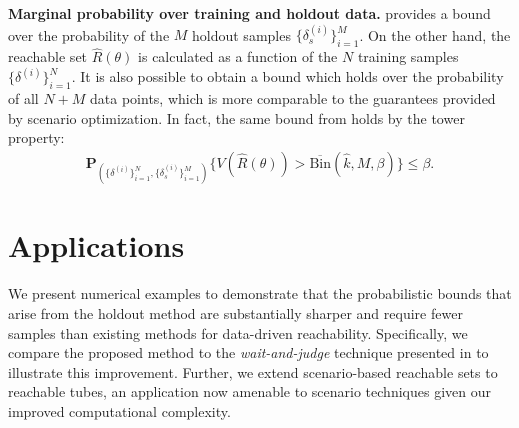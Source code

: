 \documentclass[letterpaper, 10 pt, conference]{ieeeconf}  %
\begin{document}
\textbf{Marginal probability over training and holdout data.}
 provides a bound over the probability of the $M$ holdout samples $\{\delta_s^{(i)}\}_{i=1}^{M}$.
On the other hand, the reachable set $\hat{R}(\theta)$ is calculated as a function of the $N$ training samples $\{\delta^{(i)}\}_{i=1}^{N}$.
It is also possible to obtain a bound which holds over the probability of all $N+M$ data points, which is more comparable to the guarantees provided by scenario optimization.
In fact, the same bound from  holds by the tower property:
\begin{align*}
    \mathbf{P}_{(\{\delta^{(i)}\}_{i=1}^{N},\{\delta_s^{(i)}\}_{i=1}^{M})}\{ V(\hat{R}(\theta)) >  \overline{\text{Bin}}(\hat{k}, M, \beta)  \} \leq \beta.
\end{align*}




\section{Applications}
\label{applications}
We present numerical examples to demonstrate that the probabilistic bounds that arise from the holdout method are substantially sharper and require fewer samples than existing methods for data-driven reachability. Specifically, we compare the proposed method to the \textit{wait-and-judge} technique presented in \cite{pmlr-v242-dietrich24a} to illustrate this improvement. Further, we extend scenario-based reachable sets to reachable tubes, an application now amenable to scenario techniques given our improved computational complexity. 
\end{document}
